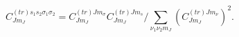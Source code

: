 \begin{equation}
C_{Jm_{J}}^{\left( tr\right) s_{1}s_{2}\sigma _{1}\sigma
_{2}}=C_{Jm_{J}}^{\left( tr\right) Jm_{\sigma }}C_{Jm_{J}}^{\left( tr\right)
Jm_{s}}/\sum_{\nu _{1}\nu _{2}m_{J}}\left( C_{Jm_{J}}^{\left( tr\right)
Jm_{\nu }}\right) ^{2}.
\end{equation}


